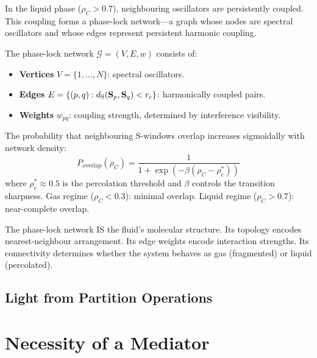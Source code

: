In the liquid phase ($\rho_C > 0.7$), neighbouring oscillators are persistently coupled. This coupling forms a phase-lock network---a graph whose nodes are spectral oscillators and whose edges represent persistent harmonic coupling.

\begin{definition}
\label{def:phase_lock}
The phase-lock network $\mathcal{G} = (V, E, w)$ consists of:
\begin{itemize}
    \item \textbf{Vertices} $V = \{1, \ldots, N\}$: spectral oscillators.
    \item \textbf{Edges} $E = \{(p,q) : d_{\mathrm{S}}(\mathbf{S}_p, \mathbf{S}_q) < r_c\}$: harmonically coupled pairs.
    \item \textbf{Weights} $w_{pq}$: coupling strength, determined by interference visibility.
\end{itemize}
\end{definition}

\begin{theorem}
\label{thm:overlap}
The probability that neighbouring S-windows overlap increases sigmoidally with network density:
\begin{equation}
    P_{\mathrm{overlap}}(\rho_C) = \frac{1}{1 + \exp(-\beta(\rho_C - \rho_c^*))}
\end{equation}
where $\rho_c^* \approx 0.5$ is the percolation threshold and $\beta$ controls the transition sharpness. Gas regime ($\rho_C < 0.3$): minimal overlap. Liquid regime ($\rho_C > 0.7$): near-complete overlap.
\end{theorem}

The phase-lock network IS the fluid's molecular structure. Its topology encodes nearest-neighbour arrangement. Its edge weights encode interaction strengths. Its connectivity determines whether the system behaves as gas (fragmented) or liquid (percolated).


\subsection{Light from Partition Operations}
\label{part:light}

\section{Necessity of a Mediator}
\label{sec:mediator}

